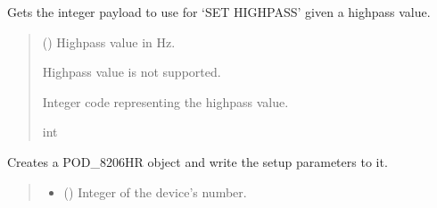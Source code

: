 \documentclass[letterpaper,10pt,english]{sphinxmanual}
\begin{document}
\begin{fulllineitems}
\begin{fulllineitems}
\end{fulllineitems}


\begin{fulllineitems}
\label{\detokenize{Setup.SetupOneDevice:Setup.SetupOneDevice.Setup_8401HR.Setup8401HR._CodeHighpass}}
\pysigstartsignatures
{}
\pysigstopsignatures
\sphinxAtStartPar
Gets the integer payload to use for ‘SET HIGHPASS’ given a highpass value.
\begin{quote}\begin{description}
\sphinxAtStartPar
{} () \textendash{} Highpass value in Hz.

\sphinxAtStartPar
{} \textendash{} High\sphinxhyphen{}pass value is not supported.

\sphinxAtStartPar
Integer code representing the highpass value.

\sphinxAtStartPar
int

\end{description}\end{quote}

\end{fulllineitems}


\begin{fulllineitems}
\label{\detokenize{Setup.SetupOneDevice:Setup.SetupOneDevice.Setup_8401HR.Setup8401HR._ConnectPODdevice}}
\pysigstartsignatures
{}
\pysigstopsignatures
\sphinxAtStartPar
Creates a POD\_8206HR object and write the setup parameters to it.
\begin{quote}\begin{description}
\begin{itemize}
\item {} 
\sphinxAtStartPar
{} () \textendash{} Integer of the device’s number.


\end{itemize}
\end{description}
\end{quote}
\end{fulllineitems}
\end{fulllineitems}
\end{document}
